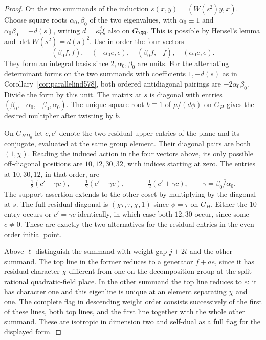 \documentclass[a4paper,11pt]{article}
\theoremstyle{definition}
\theoremstyle{remark}
\numberwithin{equation}{section}
\begin{document}
\begin{proof}
On the two summands of the induction \(s(x,y)=(W(s^2)y,x)\).
Choose square roots \(\alpha_0,\beta_0\) of the two
eigenvalues, with \(\alpha_0\equiv1\) and
\(\alpha_0\beta_0=-d(s)\), writing \(d=\kappa_\ell^j\xi\)
also on \(G_\QQ\). This is possible by Hensel's lemma and
\(\det W(s^2)=d(s)^2\). Use in order the four vectors
\[
  (\beta_0 f,f),\quad(-\alpha_0 e,e),\quad
  (\beta_0 f,-f),\quad(\alpha_0 e,e).
\]
They form an integral basis since \(2,\alpha_0,\beta_0\)
are units. For the alternating determinant forms on the two
summands with coefficients \(1,-d(s)\) as in
Corollary~\ref{cor:parallelind578}, both ordered antidiagonal
pairings are \(-2\alpha_0\beta_0\). Divide the form by this
unit. The matrix at \(s\) is diagonal with entries
\((\beta_0,-\alpha_0,-\beta_0,\alpha_0)\).
The unique square root \(b\equiv1\) of \(\mu/(d\phi)\)
on \(G_H\) gives the desired multiplier after twisting by
\(b\).

On \(G_{HD_0}\) let \(c,c'\) denote the two residual upper
entries of the plane and its conjugate, evaluated at the
same group element. Their diagonal pairs are both
\((1,\chi)\). Reading the induced action in the four
vectors above, its only possible off-diagonal positions
are \(10,12,30,32\), with indices starting at zero.
The entries at \(10,30,12\), in that order, are
\[
 \tfrac12(c'-\gamma c),\qquad \tfrac12(c'+\gamma c),
              \qquad -\tfrac12(c'+\gamma c),
       \qquad \gamma=\overline{\beta_0/\alpha_0}.
\]
The support assertion extends to the other coset by
multiplying by the diagonal at \(s\). The full residual
diagonal is \((\chi\tau,\tau,\chi,1)\) since \(\phi=\tau\)
on \(G_H\). Either the \(10\)-entry occurs or
\(c'=\gamma c\) identically, in which case both \(12,30\)
occur, since some \(c\ne0\). These are exactly the two
alternatives for the residual entries in the even-order
initial point.

Above \(\ell\) distinguish the summand with weight gap
\(j+2t\) and the other summand. The top line in the former
reduces to a generator \(f+ae\), since it has residual
character \(\chi\) different from one on the decomposition
group at the split rational quadratic-field place. In the
other summand the top line reduces to \(e\): it has character
one and this eigenline is unique at an element separating
\(\chi\) and one. The complete flag in descending weight
order consists successively of the first of these lines,
both top lines, and the first line together with the whole
other summand. These are isotropic in dimension two and
self-dual as a full flag for the displayed form.


\end{proof}
\end{document}
